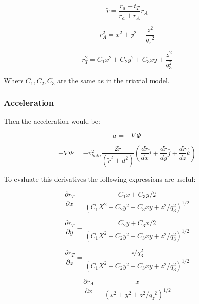 \begin{equation}
\tilde{r} = \dfrac{r_a + t_T}{r_a + r_A}r_A
\end{equation}

\begin{equation}
r_A^2 = x^2 + y^2 + \dfrac{z^2}{{q_z}^2} 
\end{equation}

\begin{equation}
r_T ^ 2 = C_1 x^2 + C_2 y^2 + C_3 xy + \dfrac{z^2}{q_3^2}
\end{equation}

Where $C_1, C_2, C_3$ are the same as in the triaxial model. 

\subsubsection{Acceleration}

Then the acceleration would be:

\begin{equation}
a = -\nabla \Phi 
\end{equation}

\begin{equation}
-\nabla \Phi = -v_{halo}^2 \dfrac{2 \tilde{r} }{ (\tilde{r}^2 + d^2)} \left(  \dfrac{d\tilde{r}}{dx} \hat{i} + \dfrac{d\tilde{r}}{dy} \hat{j} + \dfrac{d\tilde{r}}{dz} \hat{k}    \right)
\end{equation}

To evaluate this derivatives the following expressions are useful:

\begin{equation}
\dfrac{\partial r_T}{\partial x} = \dfrac{C_1x + C_3y/2}{(C_1X^2 + C_2y^2 + C_3xy + z^2/q_3^2)^{1/2}}
\end{equation}

\begin{equation}
\dfrac{\partial r_T}{\partial y} = \dfrac{C_2y + C_3x/2}{(C_1X^2 + C_2y^2 + C_3xy + z^2/q_3^2)^{1/2}}
\end{equation}

\begin{equation}
\dfrac{\partial r_T}{\partial z} = \dfrac{z/q_3^2}{(C_1X^2 + C_2y^2 + C_3xy + z^2/q_3^2)^{1/2}}
\end{equation}

\begin{equation}
\dfrac{\partial r_A}{\partial x} = \dfrac{x}{(x^2 + y^2 + z^2/{q_z}^2)^{1/2}}
\end{equation}

